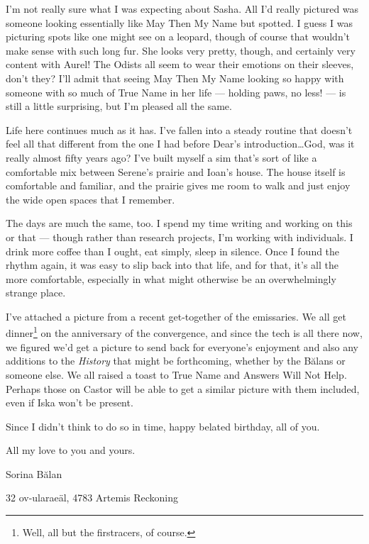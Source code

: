I'm not really sure what I was expecting about Sasha. All I'd really pictured was someone looking essentially like May Then My Name but spotted. I guess I was picturing spots like one might see on a leopard, though of course that wouldn't make sense with such long fur. She looks very pretty, though, and certainly very content with Aurel! The Odists all seem to wear their emotions on their sleeves, don't they? I'll admit that seeing May Then My Name looking so happy with someone with so much of True Name in her life — holding paws, no less! — is still a little surprising, but I'm pleased all the same.

Life here continues much as it has. I've fallen into a steady routine that doesn't feel all that different from the one I had before Dear's introduction\ldots God, was it really almost fifty years ago? I've built myself a sim that's sort of like a comfortable mix between Serene's prairie and Ioan's house. The house itself is comfortable and familiar, and the prairie gives me room to walk and just enjoy the wide open spaces that I remember.

The days are much the same, too. I spend my time writing and working on this or that — though rather than research projects, I'm working with individuals. I drink more coffee than I ought, eat simply, sleep in silence. Once I found the rhythm again, it was easy to slip back into that life, and for that, it's all the more comfortable, especially in what might otherwise be an overwhelmingly strange place.

I've attached a picture from a recent get-together of the emissaries. We all get dinner\footnote{Well, all but the firstracers, of course.} on the anniversary of the convergence, and since the tech is all there now, we figured we'd get a picture to send back for everyone's enjoyment and also any additions to the \emph{History} that might be forthcoming, whether by the Bălans or someone else. We all raised a toast to True Name and Answers Will Not Help. Perhaps those on Castor will be able to get a similar picture with them included, even if Iska won't be present.

Since I didn't think to do so in time, happy belated birthday, all of you.

All my love to you and yours.

Sorina Bălan

32 ov-ularaeäl, 4783 Artemis Reckoning
